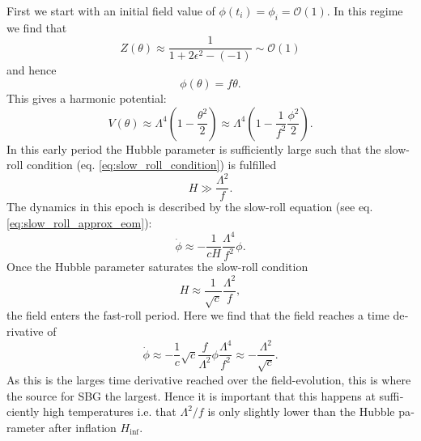 \documentclass[master,       %
               twoside,        %
               BCOR10mm,       %
               english,ngerman, %
               ]{GAUBM}
\begin{document}
\begin{otherlanguage}{english}
First we start with an initial field value of $\phi(t_i) = \phi_i = \mathcal{O}(1)$.
In this regime we find that
\begin{equation}
	Z(\theta) \approx \frac{1}{1 + 2\epsilon^2 - (-1)} \sim \mathcal{O}(1)
\end{equation}
and hence
\begin{equation}
	\phi(\theta) = f \theta.
\end{equation}
This gives a harmonic potential:
\begin{equation}
	V(\theta) \approx \Lambda^4\left(1 - \frac{\theta^2}{2}\right) \approx \Lambda^4\left(1 - \frac{1}{f^2} \frac{\phi^2}{2}\right).
\end{equation}
In this early period the Hubble parameter is sufficiently large such that the slow-roll condition (eq. \eqref{eq:slow_roll_condition}) is fulfilled
\begin{equation}
	H \gg \frac{\Lambda^2}{f}.
\end{equation}
The dynamics in this epoch is described by the slow-roll equation (see eq. \eqref{eq:slow_roll_approx_eom}):
\begin{equation}
	\dot{\phi} \approx - \frac{1}{c H} \frac{\Lambda^4}{f^2} \phi.
\end{equation}
Once the Hubble parameter saturates the slow-roll condition
\begin{equation}
	H \approx \frac{1}{\sqrt{c}} \frac{\Lambda^2}{f},
\end{equation}
the field enters the fast-roll period.
Here we find that the field reaches a time derivative of
\begin{equation}
	\dot{\phi} \approx - \frac{1}{c} \sqrt{c} \frac{f}{\Lambda^2} \phi \frac{\Lambda^4}{f^2} \approx - \frac{\Lambda^2}{\sqrt{c}}.
\end{equation}
As this is the larges time derivative reached over the field-evolution, this is where the source for SBG the largest.
Hence it is important that this happens at sufficiently high temperatures i.e. that $\Lambda^2/f$ is only slightly lower than the Hubble parameter after inflation $H_\mathrm{inf}$.


\end{otherlanguage}
\end{document}

